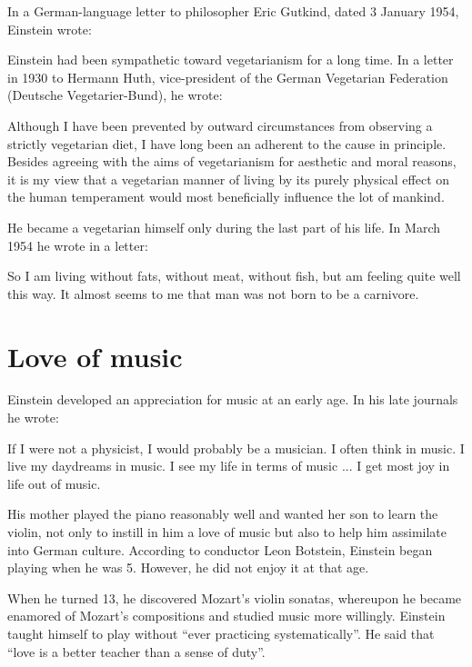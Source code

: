 \documentclass[twoside]{memoir}
\begin{document}
In a German-language letter to philosopher Eric Gutkind, dated 3 January 1954, Einstein wrote:

Einstein had been sympathetic toward vegetarianism for a long time. In a letter in 1930 to Hermann Huth, vice-president of the German Vegetarian Federation (Deutsche Vegetarier-Bund), he wrote:
\begin{displayquote}
Although I have been prevented by outward circumstances from observing a strictly vegetarian diet, I have long been an adherent to the cause in principle. Besides agreeing with the aims of vegetarianism for aesthetic and moral reasons, it is my view that a vegetarian manner of living by its purely physical effect on the human temperament would most beneficially influence the lot of mankind.
\end{displayquote}
He became a vegetarian himself only during the last part of his life. In March 1954 he wrote in a letter:
\begin{displayquote}
So I am living without fats, without meat, without fish, but am feeling quite well this way. It almost seems to me that man was not born to be a carnivore.
\end{displayquote}
\section{Love of music}
Einstein developed an appreciation for music at an early age. In his late journals he wrote:
\begin{displayquote}
If I were not a physicist, I would probably be a musician. I often think in music. I live my daydreams in music. I see my life in terms of music ... I get most joy in life out of music.
\end{displayquote}
His mother played the piano reasonably well and wanted her son to learn the violin, not only to instill in him a love of music but also to help him assimilate into German culture. According to conductor Leon Botstein, Einstein began playing when he was 5. However, he did not enjoy it at that age.

When he turned 13, he discovered Mozart's violin sonatas, whereupon he became enamored of Mozart's compositions and studied music more willingly. Einstein taught himself to play without \enquote{ever practicing systematically}. He said that \enquote{love is a better teacher than a sense of duty}.
\end{document}
